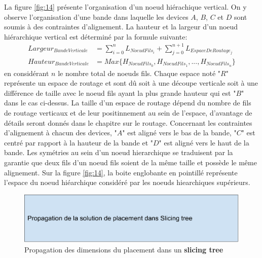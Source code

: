 La figure \ref{fig:14} présente l'organisation d'un noeud hiérachique vertical. On y observe l'organisation d'une bande dans laquelle les devices $A$, $B$, $C$ et $D$ sont soumis à des contraintes d'alignement. La hauteur et la largeur d'un noeud hiérarchique vertical est déterminé par la formule suivante:
\begin{equation}
\begin{aligned}
Largeur_{BandeVerticale} &= \sum_{i=0}^{n} L_{NoeudFils_i} + \sum_{j=0}^{n+1} L_{EspaceDeRoutage_j} \\
Hauteur_{BandeVerticale} &= Max\{H_{NoeudFils_0},H_{NoeudFils_1}, ... , H_{NoeudFils_n}\}
\end{aligned}
\end{equation}
en considérant $n$ le nombre total de noeuds fils. Chaque espace noté "$R$" représente un espace de routage et sont dû soit à une découpe verticale soit à une différence de taille avec le noeud fils ayant la plus grande hauteur qui est "$B$" dans le cas ci-dessus. La taille d'un espace de routage dépend du nombre de fils de routage verticaux et de leur positinnement au sein de l'espace, d'avantage de détails seront donnés dans le chapitre sur le routage. Concernant les contraintes d'alignement à chacun des devices, "$A$" est aligné vers le bas de la bande, "$C$" est centré par rapport à la hauteur de la bande et "$D$" est aligné vers le haut de la bande. Les symétries au sein d'un noeud hierarchique se traduisent par la garantie que deux fils d'un noeud fils soient de la même taille et possède le même alignement. Sur la figure \ref{fig:14}, la boite englobante en pointillé représente l'espace du noeud hiéarchique considéré par les noeuds hiearchiques supérieurs.


\begin{figure}[h]
\begin{center}
\includegraphics[height=0.11\textheight]{Figures/15.pdf}
\caption{Propagation des dimensions du placement dans un \textbf{slicing tree}}
\label{fig:11}
\end{center}
\end{figure} 

